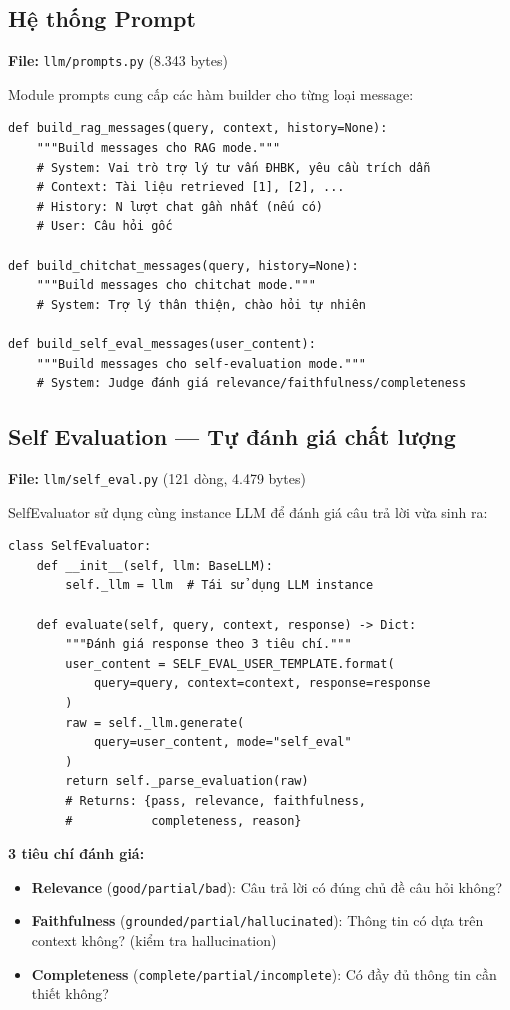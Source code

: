 \documentclass[../DoAn.tex]{subfiles}
\begin{document}
\subsection{Hệ thống Prompt}
\textbf{File:} \texttt{llm/prompts.py} (8.343 bytes)

Module prompts cung cấp các hàm builder cho từng loại message:
\begin{verbatim}
def build_rag_messages(query, context, history=None):
    """Build messages cho RAG mode."""
    # System: Vai trò trợ lý tư vấn ĐHBK, yêu cầu trích dẫn
    # Context: Tài liệu retrieved [1], [2], ...
    # History: N lượt chat gần nhất (nếu có)
    # User: Câu hỏi gốc

def build_chitchat_messages(query, history=None):
    """Build messages cho chitchat mode."""
    # System: Trợ lý thân thiện, chào hỏi tự nhiên

def build_self_eval_messages(user_content):
    """Build messages cho self-evaluation mode."""
    # System: Judge đánh giá relevance/faithfulness/completeness
\end{verbatim}

\subsection{Self Evaluation --- Tự đánh giá chất lượng}
\textbf{File:} \texttt{llm/self\_eval.py} (121 dòng, 4.479 bytes)

SelfEvaluator sử dụng cùng instance LLM để đánh giá câu trả lời vừa sinh ra:
\begin{verbatim}
class SelfEvaluator:
    def __init__(self, llm: BaseLLM):
        self._llm = llm  # Tái sử dụng LLM instance

    def evaluate(self, query, context, response) -> Dict:
        """Đánh giá response theo 3 tiêu chí."""
        user_content = SELF_EVAL_USER_TEMPLATE.format(
            query=query, context=context, response=response
        )
        raw = self._llm.generate(
            query=user_content, mode="self_eval"
        )
        return self._parse_evaluation(raw)
        # Returns: {pass, relevance, faithfulness,
        #           completeness, reason}
\end{verbatim}

\textbf{3 tiêu chí đánh giá:}
\begin{itemize}
    \item \textbf{Relevance} (\texttt{good/partial/bad}): Câu trả lời có đúng chủ đề câu hỏi không?
    \item \textbf{Faithfulness} (\texttt{grounded/partial/hallucinated}): Thông tin có dựa trên context không? (kiểm tra hallucination)
    \item \textbf{Completeness} (\texttt{complete/partial/incomplete}): Có đầy đủ thông tin cần thiết không?
\end{itemize}
\end{document}
